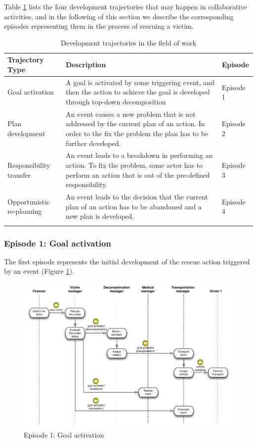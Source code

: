 Table \ref{tab:development_trajectories} lists the four development trajectories that may happen in collaborative activities, and in the following of this section we describe the corresponding episodes representing them in the process of rescuing a victim. 

{\footnotesize
	\begin{longtable}{>{\raggedright}p{1.4in}>{\raggedright}p{2.5in}>{\raggedright}p{1in}}
\toprule 
\textbf{Trajectory Type} & \textbf{Description} & \textbf{Episode}\tabularnewline
\midrule 
Goal activation & A goal is activated by some triggering event, and then the action
to achieve the goal is developed through top-down decomposition & Episode 1\tabularnewline
\midrule 
Plan development & An event causes a new problem that is not addressed by the current
plan of an action. In order to the fix the problem the plan has to
be further developed. & Episode 2\tabularnewline
\midrule 
Responsibility transfer & An event leads to a breakdown in performing an action. To fix the problem, some actor has to perform an action that is out of the pre-defined responsibility. & Episode 3\tabularnewline
\midrule 
Opportunistic re-planning & An event leads to the decision that the current plan of an action
has to be abandoned and a new plan is developed. & Episode 4\tabularnewline
\bottomrule
\caption{Development trajectories in the field of work}
\label{tab:development_trajectories}
\end{longtable}
}

\subsubsection{Episode 1: Goal activation} %
\label{ssub:episode_1_goal_activation}
The first episode represents the initial development of the rescue action triggered by an event (Figure \ref{fig:episode_1_interaction}). 

\begin{figure}[htbp] %
   \centering
   \includegraphics[width=5.8in]{episode_1_interaction.pdf} 
   \caption{Episode 1: Goal activation}
   \label{fig:episode_1_interaction}
\end{figure}

